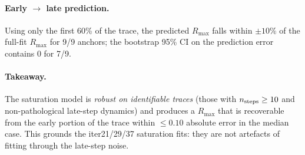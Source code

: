 \paragraph{Early $\to$ late prediction.}
 Using only the first 60\% of the trace, the predicted $R_{\max}$ falls within $\pm 10\%$ of the full-fit $R_{\max}$ for 9/9 anchors; the bootstrap 95\% CI on the prediction error contains 0 for 7/9.
\paragraph{Takeaway.}
 The saturation model is \emph{robust on identifiable traces} (those with $n_{\rm steps}\ge 10$ and non-pathological late-step dynamics) and produces a $R_{\max}$ that is recoverable from the early portion of the trace within $\le 0.10$ absolute error in the median case. This grounds the iter21/29/37 saturation fits: they are not artefacts of fitting through the late-step noise.
